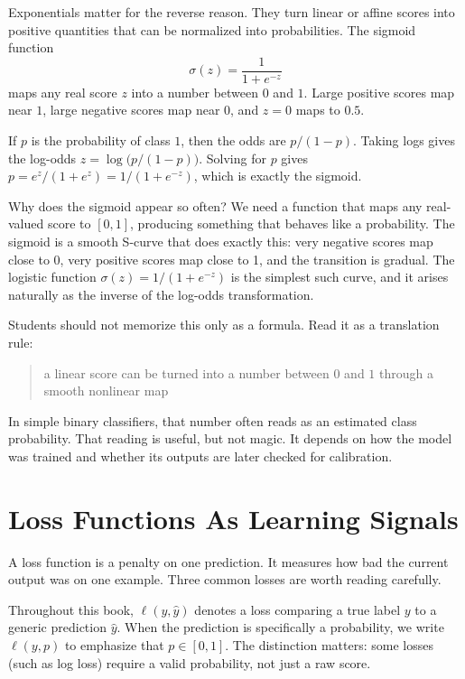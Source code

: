 Exponentials matter for the reverse reason. They turn linear or affine scores into positive quantities that can be normalized into probabilities. The sigmoid function
\[
\sigma(z) = \frac{1}{1+e^{-z}}
\]
maps any real score \(z\) into a number between \(0\) and \(1\). Large positive scores map near \(1\), large negative scores map near \(0\), and \(z=0\) maps to \(0.5\).

If \(p\) is the probability of class \(1\), then the odds are \(p/(1-p)\). Taking logs gives the log-odds \(z=\log\!\bigl(p/(1-p)\bigr)\). Solving for \(p\) gives \(p=e^z/(1+e^z)=1/(1+e^{-z})\), which is exactly the sigmoid.

Why does the sigmoid appear so often? We need a function that maps any real-valued score to $[0, 1]$, producing something that behaves like a probability. The sigmoid is a smooth S-curve that does exactly this: very negative scores map close to 0, very positive scores map close to 1, and the transition is gradual. The logistic function $\sigma(z) = 1/(1 + e^{-z})$ is the simplest such curve, and it arises naturally as the inverse of the log-odds transformation.

Students should not memorize this only as a formula. Read it as a translation rule:

\begin{quote}
a linear score can be turned into a number between \(0\) and \(1\) through a smooth nonlinear map
\end{quote}

In simple binary classifiers, that number often reads as an estimated class probability. That reading is useful, but not magic. It depends on how the model was trained and whether its outputs are later checked for calibration.

\section*{Loss Functions As Learning Signals}

A loss function is a penalty on one prediction. It measures how bad the current output was on one example. Three common losses are worth reading carefully.

Throughout this book, \(\ell(y, \hat{y})\) denotes a loss comparing a true label \(y\) to a generic prediction \(\hat{y}\). When the prediction is specifically a probability, we write \(\ell(y, p)\) to emphasize that \(p \in [0,1]\). The distinction matters: some losses (such as log loss) require a valid probability, not just a raw score.

